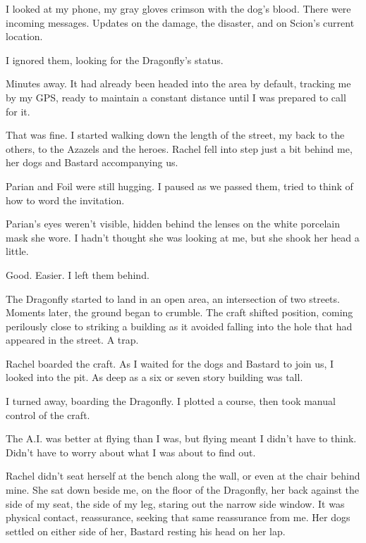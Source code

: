 I looked at my phone, my gray gloves crimson with the dog's blood.  There were incoming messages.  Updates on the damage, the disaster, and on Scion's current location.



I ignored them, looking for the Dragonfly's status.



Minutes away.  It had already been headed into the area by default, tracking me by my GPS, ready to maintain a constant distance until I was prepared to call for it.



That was fine.  I started walking down the length of the street, my back to the others, to the Azazels and the heroes.  Rachel fell into step just a bit behind me, her dogs and Bastard accompanying us.



Parian and Foil were still hugging.  I paused as we passed them, tried to think of how to word the invitation.



Parian's eyes weren't visible, hidden behind the lenses on the white porcelain mask she wore.  I hadn't thought she was looking at me, but she shook her head a little.



Good.  Easier.  I left them behind.



The Dragonfly started to land in an open area, an intersection of two streets.  Moments later, the ground began to crumble.  The craft shifted position, coming perilously close to striking a building as it avoided falling into the hole that had appeared in the street.  A trap.



Rachel boarded the craft.  As I waited for the dogs and Bastard to join us, I looked into the pit.  As deep as a six or seven story building was tall.



I turned away, boarding the Dragonfly.  I plotted a course, then took manual control of the craft.



The A.I. was better at flying than I was, but flying meant I didn't have to think.  Didn't have to worry about what I was about to find out.



Rachel didn't seat herself at the bench along the wall, or even at the chair behind mine.  She sat down beside me, on the floor of the Dragonfly, her back against the side of my seat, the side of my leg, staring out the narrow side window.  It was physical contact, reassurance, seeking that same reassurance from me.  Her dogs settled on either side of her, Bastard resting his head on her lap.



